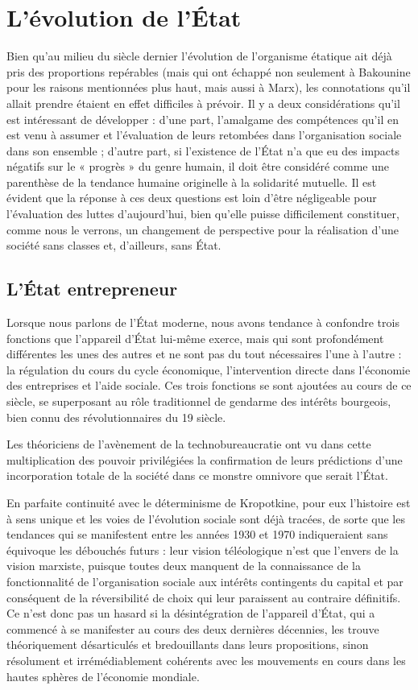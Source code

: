 \chapter{L'évolution de l'État}

Bien qu'au milieu du siècle dernier l'évolution de l'organisme étatique ait déjà pris des proportions repérables (mais qui ont échappé non seulement à Bakounine pour les raisons mentionnées plus haut, mais aussi à Marx), les connotations qu'il allait prendre étaient en effet difficiles à prévoir. Il y a deux considérations qu'il est intéressant de développer : d'une part, l’amalgame des compétences qu'il en est venu à assumer et l'évaluation de leurs retombées dans l'organisation sociale dans son ensemble ; d'autre part, si l’existence de l'État n’a que eu des impacts négatifs sur le « progrès » du genre humain, il doit être considéré comme une parenthèse de la tendance humaine originelle à la solidarité mutuelle. Il est évident que la réponse à ces deux questions est loin d'être négligeable pour l'évaluation des luttes d'aujourd'hui, bien qu'elle puisse difficilement constituer, comme nous le verrons, un changement de perspective pour la réalisation d'une société sans classes et, d'ailleurs, sans État.

\section{L'État entrepreneur}

Lorsque nous parlons de l'État moderne, nous avons tendance à confondre trois fonctions que l'appareil d'État lui-même exerce, mais qui sont profondément différentes les unes des autres et ne sont pas du tout nécessaires l'une à l'autre : la régulation du cours du cycle économique, l'intervention directe dans l'économie des entreprises et l'aide sociale. Ces trois fonctions se sont ajoutées au cours de ce siècle, se superposant au rôle traditionnel de gendarme des intérêts bourgeois, bien connu des révolutionnaires du 19\ieme{} siècle.

Les théoriciens de l'avènement de la technobureaucratie ont vu dans cette multiplication des pouvoir privilégiées la confirmation de leurs prédictions d'une incorporation totale de la société dans ce monstre omnivore que serait l'État.

En parfaite continuité avec le déterminisme de Kropotkine, pour eux l'histoire est à sens unique et les voies de l'évolution sociale sont déjà tracées, de sorte que les tendances qui se manifestent entre les années 1930 et 1970 indiqueraient sans équivoque les débouchés futurs : leur vision téléologique n'est que l'envers de la vision marxiste, puisque toutes deux manquent de la connaissance de la fonctionnalité de l'organisation sociale aux intérêts contingents du capital et par conséquent de la réversibilité de choix qui leur paraissent au contraire définitifs. Ce n'est donc pas un hasard si la désintégration de l'appareil d'État, qui a commencé à se manifester au cours des deux dernières décennies, les trouve théoriquement désarticulés et bredouillants dans leurs propositions, sinon résolument et irrémédiablement cohérents avec les mouvements en cours dans les hautes sphères de l'économie mondiale.

